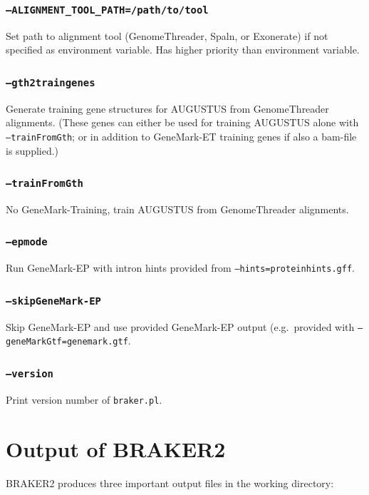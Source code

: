\documentclass[a4paper,10pt]{report}
\begin{document}
    \subsection{\texttt{--ALIGNMENT\_TOOL\_PATH=/path/to/tool}}  Set path to alignment tool (GenomeThreader, Spaln, or Exonerate) if not 
                                         specified as environment variable. Has higher priority than environment
                                         variable.
    \subsection{\texttt{--gth2traingenes}}                     Generate training gene structures for AUGUSTUS from GenomeThreader
                                         alignments. (These genes can either be used for training AUGUSTUS
					 alone with \texttt{--trainFromGth}; or in addition to GeneMark-ET training genes if 
					 also a bam-file is supplied.)
    \subsection{\texttt{--trainFromGth}}                       No GeneMark-Training, train AUGUSTUS from GenomeThreader alignments.
    \subsection{\texttt{--epmode}}                             Run GeneMark-EP with intron hints provided from \texttt{--hints=proteinhints.gff}.
    \subsection{\texttt{--skipGeneMark-EP}}                    Skip GeneMark-EP and use provided GeneMark-EP output (e.g.~provided with
                                         \texttt{--geneMarkGtf=genemark.gtf}.
    \subsection{\texttt{--version}}                            Print version number of \texttt{braker.pl}.                          


\chapter{Output of BRAKER2}

BRAKER2 produces three important output files in the working directory:
\end{document}
